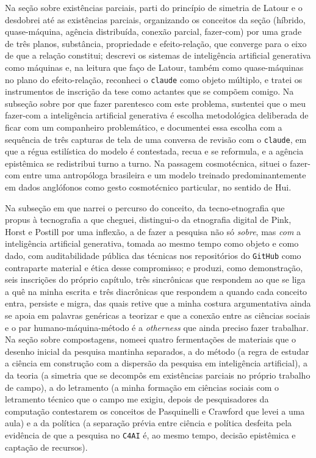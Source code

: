 Na seção sobre existências parciais, parti do princípio de simetria de Latour e o desdobrei até as existências parciais, organizando os conceitos da seção (híbrido, quase-máquina, agência distribuída, conexão parcial, fazer-com) por uma grade de três planos, substância, propriedade e efeito-relação, que converge para o eixo de que a relação constitui; descrevi os sistemas de inteligência artificial generativa como máquinas e, na leitura que faço de Latour, também como quase-máquinas no plano do efeito-relação, reconheci o \texttt{claude} como objeto múltiplo, e tratei os instrumentos de inscrição da tese como actantes que se compõem comigo. Na subseção sobre por que fazer parentesco com este problema, sustentei que o meu fazer-com a inteligência artificial generativa é escolha metodológica deliberada de ficar com um companheiro problemático, e documentei essa escolha com a sequência de três capturas de tela de uma conversa de revisão com o \texttt{claude}, em que a régua estilística do modelo é contestada, recua e se reformula, e a agência epistêmica se redistribui turno a turno. Na passagem cosmotécnica, situei o fazer-com entre uma antropóloga brasileira e um modelo treinado predominantemente em dados anglófonos como gesto cosmotécnico particular, no sentido de Hui.

Na subseção em que narrei o percurso do conceito, da tecno-etnografia que propus à tecnografia a que cheguei, distingui-o da etnografia digital de Pink, Horst e Postill por uma inflexão, a de fazer a pesquisa não só \textit{sobre}, mas \textit{com} a inteligência artificial generativa, tomada ao mesmo tempo como objeto e como dado, com auditabilidade pública das técnicas nos repositórios do \texttt{GitHub} como contraparte material e ética desse compromisso; e produzi, como demonstração, seis inscrições do próprio capítulo, três sincrônicas que respondem ao que se liga a quê na minha escrita e três diacrônicas que respondem a quando cada conceito entra, persiste e migra, das quais retive que a minha costura argumentativa ainda se apoia em palavras genéricas a teorizar e que a conexão entre as ciências sociais e o par humano-máquina-método é a \textit{otherness} que ainda preciso fazer trabalhar. Na seção sobre compostagens, nomeei quatro fermentações de materiais que o desenho inicial da pesquisa mantinha separados, a do método (a regra de estudar a ciência em construção com a dispersão da pesquisa em inteligência artificial), a da teoria (a simetria que se decompôs em existências parciais no próprio trabalho de campo), a do letramento (a minha formação em ciências sociais com o letramento técnico que o campo me exigiu, depois de pesquisadores da computação contestarem os conceitos de Pasquinelli e Crawford que levei a uma aula) e a da política (a separação prévia entre ciência e política desfeita pela evidência de que a pesquisa no \texttt{C4AI} é, ao mesmo tempo, decisão epistêmica e captação de recursos).

